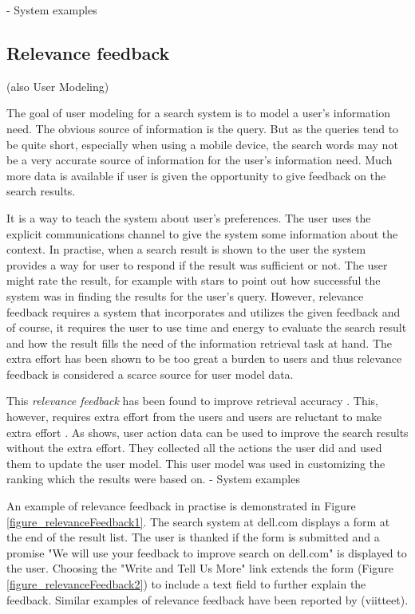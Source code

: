 \documentclass{sigchi}
\begin{document}
- System examples
\subsection{Relevance feedback}
(also User Modeling) 

The goal of user modeling for a search system is to model a user's information need. The obvious source of information is the query. But as the queries tend to be quite short, especially when using a mobile device, the search words may not be a very accurate source of information for the user's information need. Much more data is available if user is given the opportunity to give feedback on the search results. 

It is a way to teach the system about user's preferences. The user uses the explicit communications channel to give the system some information about the context. In practise, when a search result is shown to the user the system provides a way for user to respond if the result was sufficient or not. The user might rate the result, for example with stars to point out how successful the system was in finding the results for the user's query. However, relevance feedback requires a system that incorporates and utilizes the given feedback and of course, it requires the user to use time and energy to evaluate the search result and how the result fills the need of the information retrieval task at hand. The extra effort has been shown to be too great a burden to users and thus relevance feedback is considered a scarce source for user model data.

This \emph{relevance feedback} has been found to improve retrieval accuracy \cite{salton90}. This, however, requires extra effort from the users and users are reluctant to make extra effort \cite{kelly03}. As \cite{shen05} shows, user action data can be used to improve the search results without the extra effort. They collected all the actions the user did and used them to update the user model. This user model was used in customizing the ranking which the results were based on.
- System examples

An example of relevance feedback in practise is demonstrated in Figure \ref{figure_relevanceFeedback1}. The search system at dell.com displays a form at the end of the result list. The user is thanked if the form is submitted and a promise "We will use your feedback to improve search on dell.com" is displayed to the user. Choosing the "Write and Tell Us More" link extends the form (Figure \ref{figure_relevanceFeedback2}) to include a text field to further explain the feedback. Similar examples of relevance feedback have been reported by (viitteet).
\end{document}
